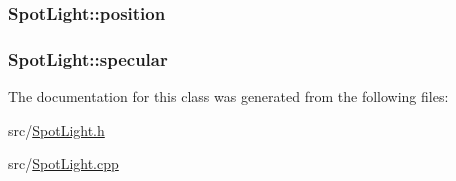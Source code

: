 \subsubsection[{\texorpdfstring{position}{position}}]{ Spot\+Light\+::position\hspace{0.3cm}{\ttfamily [private]}}\hypertarget{classSpotLight_aca124556510f5fd4d44660174f077cd7}{}\label{classSpotLight_aca124556510f5fd4d44660174f077cd7}
\subsubsection[{\texorpdfstring{specular}{specular}}]{ Spot\+Light\+::specular\hspace{0.3cm}{\ttfamily [private]}}\hypertarget{classSpotLight_a21623e0e4a294ddb7068ee618dfab1d6}{}\label{classSpotLight_a21623e0e4a294ddb7068ee618dfab1d6}


The documentation for this class was generated from the following files\+:\begin{DoxyCompactItemize}
\item 
src/\hyperlink{SpotLight_8h}{Spot\+Light.\+h}\item 
src/\hyperlink{SpotLight_8cpp}{Spot\+Light.\+cpp}\end{DoxyCompactItemize}
